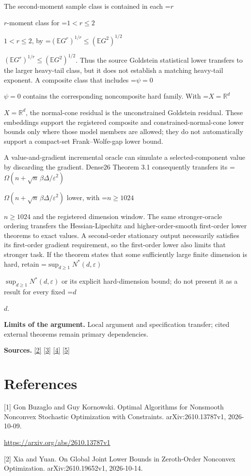 \documentclass[10pt,a4paper]{article}
\newcommand{\AtlasMath}[1]{\par\begingroup\centering\setbox0=\hbox{$\displaystyle #1$}\ifdim\wd0>1.4\linewidth\typeout{ATLAS WIDE FORMULA: \the\wd0}\fi\ifdim\wd0>\linewidth\resizebox{\linewidth}{!}{\box0}\else\box0\fi\par\endgroup}
\newcommand{\AtlasInlineMath}[1]{\begingroup\setbox0=\hbox{$#1$}\ifdim\wd0>.4\linewidth\endgroup\AtlasMath{#1}\else\endgroup$#1$\fi}
\begin{document}
The second-moment sample class is contained in each \AtlasInlineMath{r}-moment class for \AtlasInlineMath{1<r\le2}, by \AtlasInlineMath{(\mathbb EG^r)^{1/r}\le(\mathbb EG^2)^{1/2}}. Thus the source Goldstein statistical lower transfers to the larger heavy-tail class, but it does not establish a matching heavy-tail exponent. A composite class that includes \AtlasInlineMath{\psi=0} contains the corresponding noncomposite hard family. With \AtlasInlineMath{X=\mathbb R^d}, the normal-cone residual is the unconstrained Goldstein residual. These embeddings support the registered composite and constrained-normal-cone lower bounds only where those model members are allowed; they do not automatically support a compact-set Frank--Wolfe-gap lower bound.

A value-and-gradient incremental oracle can simulate a selected-component value by discarding the gradient. Dense26 Theorem 3.1 consequently transfers its \AtlasInlineMath{\Omega(n+\sqrt n\,\beta\Delta/\varepsilon^2)} lower, with \AtlasInlineMath{n\ge1024} and the registered dimension window. The same stronger-oracle ordering transfers the Hessian-Lipschitz and higher-order-smooth first-order lower theorems to exact values. A second-order stationary output necessarily satisfies its first-order gradient requirement, so the first-order lower also limits that stronger task. If the theorem states that some sufficiently large finite dimension is hard, retain \AtlasInlineMath{\sup_{d\ge1}N^*(d,\varepsilon)} or its explicit hard-dimension bound; do not present it as a result for every fixed \AtlasInlineMath{d}.

\textbf{Limits of the argument.} Local argument and specification transfer; cited external theorems remain primary dependencies.

\textbf{Sources.} \href{https://arxiv.org/html/2610.19652v1}{[2]} \href{https://arxiv.org/html/2609.00045v3}{[3]} \href{https://arxiv.org/pdf/2610.00245v2}{[4]} \href{https://arxiv.org/html/2610.17074v1}{[5]}

\section{References}
[1] Gon Buzaglo and Guy Kornowski. Optimal Algorithms for Nonsmooth Nonconvex Stochastic Optimization with Constraints. arXiv:2610.13787v1, 2026-10-09.

\url{https://arxiv.org/abs/2610.13787v1}

[2] Xia and Yuan. On Global Joint Lower Bounds in Zeroth-Order Nonconvex Optimization. arXiv:2610.19652v1, 2026-10-14.
\end{document}
